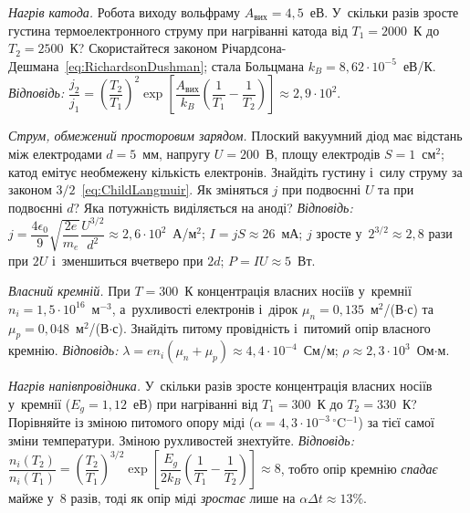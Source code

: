 \begin{problem}\label{prb:RichardsonRatio}
	\emph{Нагрів катода.} Робота виходу вольфраму $A_{\text{вих}}=4{,}5$~еВ. У~скільки
	разів зросте густина термоелектронного струму при нагріванні катода від $T_1=2000$~К
	до $T_2=2500$~К? Скористайтеся законом
	Річардсона-Дешмана~\eqref{eq:RichardsonDushman}; стала Больцмана
	$k_B=8{,}62\cdot10^{-5}$~еВ/К. \emph{Відповідь:}
	$\dfrac{j_2}{j_1}=\left(\dfrac{T_2}{T_1}\right)^{2}\exp\!\left[\dfrac{A_{\text{вих}}}{k_B}\left(\dfrac1{T_1}-\dfrac1{T_2}\right)\right]\approx2{,}9\cdot10^{2}$.
\end{problem}

\begin{problem}\label{prb:ChildLangmuir}
	\emph{Струм, обмежений просторовим зарядом.} Плоский вакуумний діод має відстань між
	електродами $d=5$~мм, напругу $U=200$~В, площу електродів $S=1$~см$^2$; катод емітує
	необмежену кількість електронів. Знайдіть густину і~силу струму за законом
	$3/2$~\eqref{eq:ChildLangmuir}. Як зміняться $j$ при подвоєнні $U$ та при подвоєнні
	$d$? Яка потужність виділяється на аноді? \emph{Відповідь:}
	$j=\dfrac{4\epsilon_0}{9}\sqrt{\dfrac{2e}{m_e}}\dfrac{U^{3/2}}{d^2}\approx2{,}6\cdot10^{2}$~А/м$^2$;
	$I=jS\approx26$~мА; $j$ зросте у~$2^{3/2}\approx2{,}8$ рази при $2U$ і~зменшиться
	вчетверо при $2d$; $P=IU\approx5$~Вт.
\end{problem}

\begin{problem}\label{prb:IntrinsicSilicon}
	\emph{Власний кремній.} При $T=300$~К концентрація власних носіїв у~кремнії
	$n_i=1{,}5\cdot10^{16}$~м$^{-3}$, а~рухливості електронів і~дірок
	$\mu_n=0{,}135$~м$^2$/(В$\cdot$с) та $\mu_p=0{,}048$~м$^2$/(В$\cdot$с). Знайдіть
	питому провідність і~питомий опір власного кремнію. \emph{Відповідь:}
	$\lambda=en_i(\mu_n+\mu_p)\approx4{,}4\cdot10^{-4}$~См/м;
	$\rho\approx2{,}3\cdot10^{3}$~Ом$\cdot$м.
\end{problem}

\begin{problem}\label{prb:IntrinsicTemperature}
	\emph{Нагрів напівпровідника.} У~скільки разів зросте концентрація власних носіїв
	у~кремнії ($E_g=1{,}12$~еВ) при нагріванні від $T_1=300$~К до $T_2=330$~К? Порівняйте
	із зміною питомого опору міді ($\alpha=4{,}3\cdot10^{-3}\,{}^\circ$C$^{-1}$) за тієї
	самої зміни температури. Зміною рухливостей знехтуйте. \emph{Відповідь:}
	$\dfrac{n_i(T_2)}{n_i(T_1)}=\left(\dfrac{T_2}{T_1}\right)^{3/2}\exp\!\left[\dfrac{E_g}{2k_B}\left(\dfrac1{T_1}-\dfrac1{T_2}\right)\right]\approx8$,
	тобто опір кремнію \emph{спадає} майже у~$8$ разів, тоді як опір міді \emph{зростає}
	лише на $\alpha\Delta t\approx13\%$.
\end{problem}

